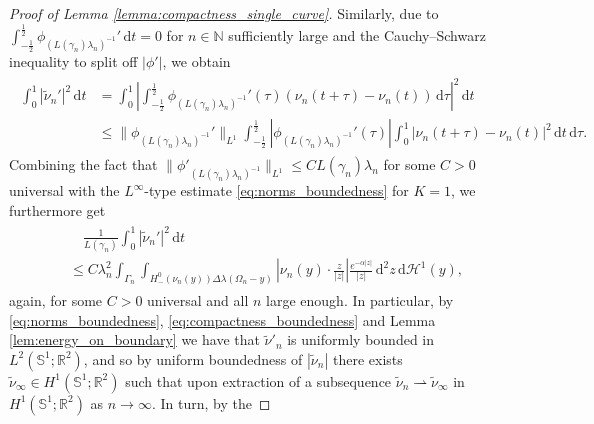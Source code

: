 \documentclass[11pt]{article}
\numberwithin{statement}{section}
\numberwithin{equation}{section}
\theoremstyle{remark}
\newcommand{\R}{\mathbb R} 				%
\newcommand{\N}{\mathbb N}
\newcommand{\intd}{\, \mathrm{d}} 				%
\newcommand{\Sph}{{\mathbb S}}				%
\newcommand{\Hd}{\mathcal H}				%
\begin{document}
\begin{proof}[Proof of Lemma \ref{lemma:compactness_single_curve}]
        Similarly, due to
        $\int_{-\frac{1}{2}}^{\frac{1}{2}}
        \phi_{(L(\gamma_{n}){\lambda_n})^{-1}}' \intd t =0$ for
        $n \in \N $ sufficiently large and the Cauchy--Schwarz
        inequality to split off $|\phi '|$, we obtain
	\begin{align}\label{eq:rigidity_derivative}
	  \begin{split}
            \int_0^1 |\tilde \nu_{n}'|^2 \intd t & = \int_0^1
            \left|\int_{-\frac{1}{2}}^{\frac{1}{2}}
              \phi_{(L(\gamma_{n}) {\lambda_n})^{-1}} '(\tau)
              (\nu_{n}(t + \tau) - \nu_{n}(t)) \intd \tau \right|^2
            \intd t
            \\
            & \leq \| \phi_{(L(\gamma_{n}){\lambda_n})^{-1}}'\|_{L^1}
            \int_{-\frac{1}{2}}^{\frac{1}{2}} \left|
              \phi_{(L(\gamma_{n}) {\lambda_n})^{-1}} '(\tau) \right|
            \int_0^1 \left|\nu_{n}(t + \tau) - \nu_{n}(t) \right|^2
            \intd t \intd \tau.
	  \end{split}
	\end{align}
	Combining the fact that
        $\|\phi'_{(L(\gamma_{n}){\lambda_n})^{-1}}\|_{L^1} \leq
        CL(\gamma_{n}) {\lambda_n}$ for some $C > 0$ universal with
        the $L^\infty$-type estimate \eqref{eq:norms_boundedness}
        for $K= 1$, we furthermore get
	\begin{align}\label{eq:derivative_normal_bound}
	  \begin{split}
            & \quad \frac{1}{L (\gamma_{n})} \int_0^1 |\tilde
            \nu_{n}'|^2 \intd t \\ 
            & \leq C \lambda_n^2 \int_{\Gamma_{n}} \int_{
              H^0_-(\nu_{n}(y)) \Delta \lambda(\Omega_n - y) }
            \left| \nu_{n}(y) \cdot \frac{ z}{|z|} \right|
            \frac{e^{-\alpha |z|}}{|z|} \intd^2 z \intd \Hd^1(y),
	  \end{split}
	\end{align}
        again, for some $C > 0$ universal and all $n$ large
          enough.  In particular, by
          \eqref{eq:norms_boundedness},
          \eqref{eq:compactness_boundedness} and Lemma
          \ref{lem:energy_on_boundary} we have that $\tilde \nu'_{n}$
        is uniformly bounded in $L^2(\Sph^1; \R^2)$, and so by
          uniform boundedness of $|\tilde \nu_n|$ there exists
        $\tilde \nu_\infty \in H^{1}(\Sph^1;\R^2)$ such that upon
        extraction of a subsequence
        $\tilde \nu_{n} \rightharpoonup \tilde \nu_\infty$ in
        $H^1(\Sph^1; \R^2)$ as $n \to \infty$. In turn, by the

\end{proof}
\end{document}
